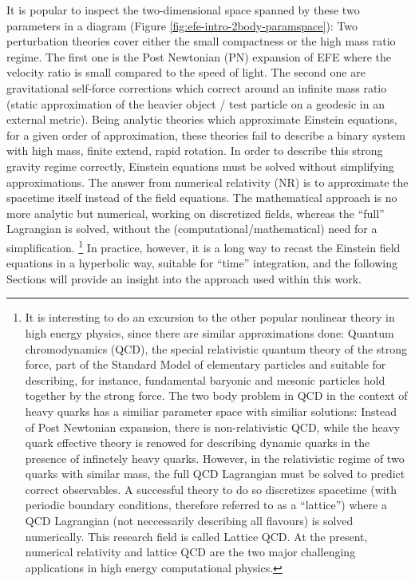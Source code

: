 It is popular to inspect the two-dimensional space spanned by these two parameters
in a diagram (Figure \ref{fig:efe-intro-2body-paramspace}): Two perturbation theories
cover either the small compactness or the high mass ratio regime. The first one is
the Post Newtonian (PN) expansion of EFE where the velocity ratio is small compared to the speed
of light. The second one are gravitational self-force corrections \cite{Wald:2009ue} which
correct around an infinite mass ratio (static approximation of the heavier object /
test particle on a geodesic in an external metric).
Being analytic theories which approximate Einstein equations, for a given order of
approximation, these theories fail to describe a binary system with high mass, finite extend,
rapid rotation. In order to describe this strong gravity regime correctly, Einstein equations
must be solved without simplifying approximations. The answer from numerical relativity (NR) is to
approximate the spacetime itself instead of the field equations. The mathematical approach is
no more analytic but numerical, working on discretized fields, whereas the ``full'' Lagrangian
is solved, without the (computational/mathematical) need for a simplification.
\footnote{
It is interesting to do an excursion to the other popular nonlinear theory
in high energy physics, since there are similar approximations done: Quantum chromodynamics
(QCD), the special relativistic quantum theory of the strong force,
 part of the Standard Model of elementary particles and suitable for 
 describing, for instance,
 fundamental baryonic and mesonic particles hold together by the strong force.
The two body problem in QCD in the context of heavy quarks has a similiar parameter
space with similiar solutions: Instead of Post Newtonian
expansion, there is non-relativistic QCD, while the heavy quark effective theory is
renowed for describing dynamic quarks in the presence of infinetely heavy quarks. However,
in the relativistic regime of two quarks with similar mass, the full QCD Lagrangian must be
solved to predict correct observables. A successful theory to do so discretizes spacetime
(with periodic boundary conditions, therefore referred to as a ``lattice'') where
a QCD Lagrangian (not neccessarily describing all flavours) is solved
numerically. This research field is called Lattice QCD. At the present, numerical relativity and
lattice QCD are the two major challenging applications in high energy computational physics.
} %
In practice, however, it is a long way to recast the Einstein field equations in a hyperbolic
way, suitable for ``time'' integration, and the following Sections will provide an
insight into the approach used within this work.

